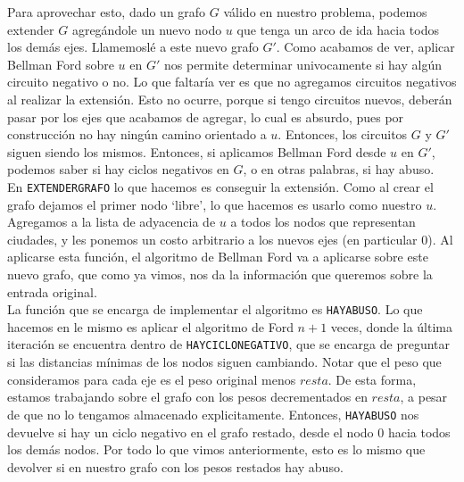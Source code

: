 Para aprovechar esto, dado un grafo  $G$ válido en nuestro problema, podemos extender $G$ agregándole un nuevo nodo $u$ que tenga un arco de ida hacia todos los demás ejes. Llamemoslé a este nuevo grafo $G'$. Como acabamos de ver, aplicar Bellman Ford sobre $u$ en $G'$ nos permite determinar univocamente si hay algún circuito negativo o no. Lo que faltaría ver es que no agregamos circuitos negativos al realizar la extensión. Esto no ocurre, porque si tengo circuitos nuevos, deberán pasar por los ejes que acabamos de agregar, lo cual es absurdo, pues por construcción no hay ningún camino orientado a $u$. Entonces, los circuitos $G$ y $G'$ siguen siendo los mismos. Entonces, si aplicamos Bellman Ford desde $u$ en $G'$, podemos saber si hay ciclos negativos en $G$, o en otras palabras, si hay abuso. \\

En \texttt{EXTENDERGRAFO} lo que hacemos es conseguir la extensión. Como al crear el grafo dejamos el primer nodo `libre', lo que hacemos es usarlo como nuestro $u$. Agregamos a la lista de adyacencia de $u$ a todos los nodos que representan ciudades, y les ponemos un costo arbitrario a los nuevos ejes (en particular $0$). Al aplicarse esta función, el algoritmo de Bellman Ford va a aplicarse sobre este nuevo grafo, que como ya vimos, nos da la información que queremos sobre la entrada original. \\

La función que se encarga de implementar el algoritmo es \texttt{HAYABUSO}. Lo que hacemos en le mismo es aplicar el algoritmo de Ford $n+1$ veces, donde la última iteración se encuentra dentro de \texttt{HAYCICLONEGATIVO}, que se encarga de preguntar si las distancias mínimas de los nodos siguen cambiando. Notar que el peso que consideramos para cada eje es el peso original menos $resta$. De esta forma, estamos trabajando sobre el grafo con los pesos decrementados en $resta$, a pesar de que no lo tengamos almacenado explicitamente. Entonces, \texttt{HAYABUSO} nos devuelve si hay un ciclo negativo en el grafo restado, desde el nodo $0$ hacia todos los demás nodos. Por todo lo que vimos anteriormente, esto es lo mismo que devolver si en nuestro grafo con los pesos restados hay abuso. \\

